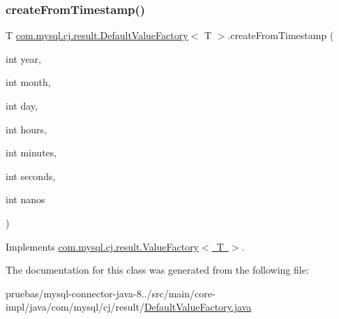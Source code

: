\subsubsection{\texorpdfstring{create\+From\+Timestamp()}{createFromTimestamp()}}
{\footnotesize\ttfamily T \mbox{\hyperlink{classcom_1_1mysql_1_1cj_1_1result_1_1_default_value_factory}{com.\+mysql.\+cj.\+result.\+Default\+Value\+Factory}}$<$ T $>$.create\+From\+Timestamp (\begin{DoxyParamCaption}\item[{int}]{year,  }\item[{int}]{month,  }\item[{int}]{day,  }\item[{int}]{hours,  }\item[{int}]{minutes,  }\item[{int}]{seconds,  }\item[{int}]{nanos }\end{DoxyParamCaption})}



Implements \mbox{\hyperlink{interfacecom_1_1mysql_1_1cj_1_1result_1_1_value_factory_accbdc6c6970a22e40a0b1d72213334e6}{com.\+mysql.\+cj.\+result.\+Value\+Factory$<$ T $>$}}.



The documentation for this class was generated from the following file\+:\begin{DoxyCompactItemize}
\item 
pruebas/mysql-\/connector-\/java-\/8../src/main/core-\/impl/java/com/mysql/cj/result/\mbox{\hyperlink{_default_value_factory_8java}{Default\+Value\+Factory.\+java}}\end{DoxyCompactItemize}
